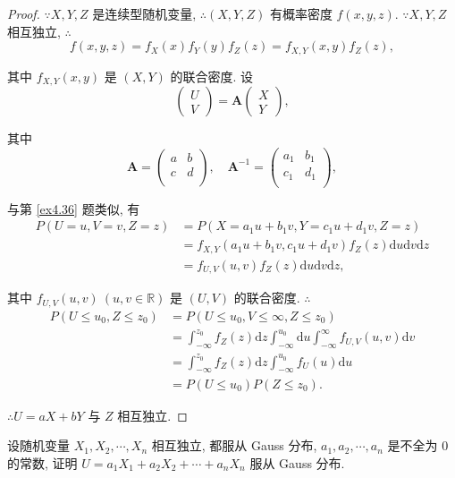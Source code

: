 \documentclass{ctexart}
\begin{document}
\begin{proof}
    $\because X,Y,Z$ 是连续型随机变量, $\therefore(X,Y,Z)$ 有概率密度 $f(x,y,z)$. $\because X,Y,Z$ 相互独立, $\therefore$
    \[f(x,y,z)=f_X(x)f_Y(y)f_Z(z)=f_{X,Y}(x,y)f_Z(z),\]

    其中 $f_{X,Y}(x,y)$ 是 $(X,Y)$ 的联合密度. 设
    \[\begin{pmatrix}
        U \\ V
    \end{pmatrix}=\boldsymbol{A}\begin{pmatrix}
        X \\ Y
    \end{pmatrix},\]
    
    其中
    \[\boldsymbol{A}=\begin{pmatrix}
        a & b \\
        c & d \\
    \end{pmatrix},\quad\boldsymbol{A}^{-1}=\begin{pmatrix}
        a_1 & b_1 \\
        c_1 & d_1 \\
    \end{pmatrix},\]

    与第 \ref{ex4.36} 题类似, 有
    \begin{align*}
        P(U=u,V=v,Z=z) & =P(X=a_1u+b_1v,Y=c_1u+d_1v,Z=z) \\
        & =f_{X,Y}(a_1u+b_1v,c_1u+d_1v)f_Z(z)\mathrm{d}u\mathrm{d}v\mathrm{d}z \\
        & =f_{U,V}(u,v)f_Z(z)\mathrm{d}u\mathrm{d}v\mathrm{d}z,
    \end{align*}

    其中 $f_{U,V}(u,v)\ (u,v\in\mathbb{R})$ 是 $(U,V)$ 的联合密度. $\therefore$
    \begin{align*}
        P(U\leq u_0,Z\leq z_0) & =P(U\leq u_0,V\leq\infty,Z\leq z_0) \\
        & =\int_{-\infty}^{z_0}f_Z(z)\mathrm{d}z\int_{-\infty}^{u_0}\mathrm{d}u\int_{-\infty}^\infty f_{U,V}(u,v)\mathrm{d}v \\
        & =\int_{-\infty}^{z_0}f_Z(z)\mathrm{d}z\int_{-\infty}^{u_0}f_U(u)\mathrm{d}u \\
        & =P(U\leq u_0)P(Z\leq z_0).
    \end{align*}

    $\therefore U=aX+bY$ 与 $Z$ 相互独立.
\end{proof}
\begin{exercise}\label{ex4.27}
    设随机变量 $X_1,X_2,\cdots,X_n$ 相互独立, 都服从 Gauss 分布, $a_1,a_2,\cdots,a_n$ 是不全为 $0$ 的常数, 证明 $U=a_1X_1+a_2X_2+\cdots+a_nX_n$ 服从 Gauss 分布.
\end{exercise}
\end{document}
